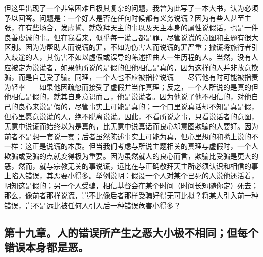 但这里出现了一个非常困难且极其复杂的问题，我曾为此写了一本大书，认为必须予以回答。问题是：一个好人是否在任何时候都有义务说谎？因为有些人甚至主张，在有些场合，发虚誓、就敬拜天主的事以及天主本身的属性说假话，也是一件良善虔诚的事。但在我看来，似乎每一谎言都是罪，尽管说谎的意图和主题有很大区别。因为为帮助人而说谎的罪，不如为伤害人而说谎的罪严重；撒谎将旅行者引入歧途的人，其伤害不如以虚假或误导的陈述扭曲人一生历程的人。当然，没有人应被定为说谎者，如果他所说的是假的但他相信是真的，因为这样的人并非故意欺骗，而是自己受了骗。同理，一个人也不应被指控说谎——尽管他有时可能被指责为轻率——如果他因疏忽而接受了虚假并当作真理；反之，一个人所说的是真的但他相信是假的，就其自身意识而言，他是说谎者。因为他说了他不相信的，对他自己的良心来说是假的，尽管事实上可能是真的；一个口里说真话却不知是真是假，但心里愿意说谎的人，绝不脱离说谎。因此，不看所说之事，只看说话者的意图，无意中说谎而始终以为是真的，比无意中说真话而良心却意图欺骗的人要好。因为前者不是想一套说一套；后者虽然陈述事实上可能为真，但心里想的和嘴上说的不一样：这正是说谎的本质。但当我们考虑与所说主题相关的真理与虚假时，一个人欺骗或受骗的点就变得极为重要。因为虽然就人的良心而言，欺骗比受骗是更大的恶，然而，就与宗教无关的事说谎，远比在与正确敬拜天主所必须认识和相信的事上陷入错误，其恶要小得多。举例说明：假设一个人对某个已死的人说他还活着，明知这是假的；另一个人受骗，相信基督会在某个时间（时间长短随你定）死去；那么，像前者那样说谎，岂不比像后者那样受骗好得无可比拟？将某人引入前一种错误，岂不是远比被任何人引入后一种错误危害小得多？\par


\subsection{第十九章。人的错误所产生之恶大小极不相同；但每个错误本身都是恶。}


